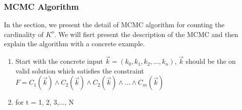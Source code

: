 \subsubsection{MCMC Algorithm}
In the section, we present the detail of MCMC algorithm for counting the 
cardinality of $K^o$. We will fisrt present the description of the 
MCMC and then explain the algorithm with a concrete example.
\begin{enumerate}
      \item Start with the concrete input $\vec{k} = (k_0, k_1, k_2, ..., k_n)$,
      $\vec{k}$ should be the on valid solution which satisfies the constraint
      $F = C_1(\vec{k})\land C_2(\vec{k})\land C_2(\vec{k}) \land ... \land C_m(\vec{k})$
      \item for t = 1, 2, 3,..., N
\end{enumerate}